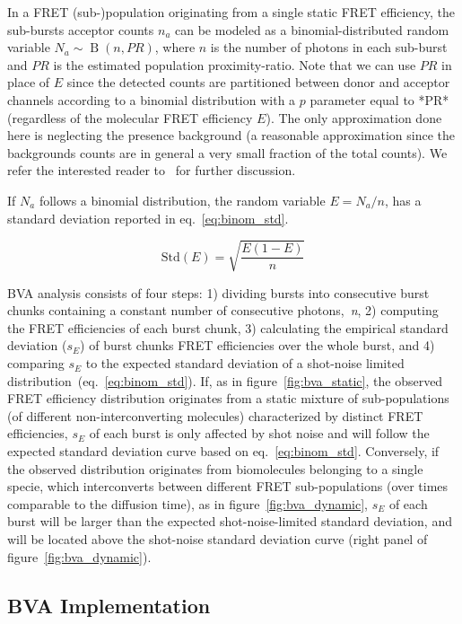 In a FRET (sub-)population originating from a single static FRET efficiency,
the sub-bursts acceptor counts $n_a$ can be modeled as a binomial-distributed random variable 
$N_a \sim \operatorname{B}(n, PR)$, where $n$ is the number of photons in each sub-burst and 
$PR$ is the estimated population proximity-ratio. 
Note that we can use $PR$ in place of $E$ since the detected counts are partitioned 
between donor and acceptor channels according to a binomial distribution with 
a $p$ parameter equal to *PR* (regardless of the molecular FRET efficiency $E$).
The only approximation done here is neglecting the presence background
(a reasonable approximation since the backgrounds counts are in general a 
very small fraction of the total counts). 
We refer the interested reader to~\cite{Torella_2011} for further discussion.

If $N_a$ follows a binomial distribution, the random variable $E = N_a/n$,
has a standard deviation reported in eq.~\ref{eq:binom_std}. 

\begin{equation}
\label{eq:binom_std}
\operatorname{Std(\textit{E})} = {\sqrt{\frac{E(1 - E)}{n}}}
\end{equation}

BVA analysis consists of four steps: 1) dividing bursts into consecutive burst chunks containing a constant number of consecutive photons,~\textit{n}, 2) computing the FRET efficiencies of each burst chunk, 3) calculating the empirical standard deviation ($s_E$) of burst chunks FRET efficiencies over the whole burst, and 4) comparing $s_E$ to the expected standard deviation of a shot-noise limited distribution~(eq.~\ref{eq:binom_std}).
If, as in figure~\ref{fig:bva_static}, the observed FRET efficiency distribution 
originates from a static mixture of sub-populations (of different 
non-interconverting molecules) characterized by distinct FRET efficiencies, 
$s_E$ of each burst is only affected by shot noise and will follow the expected standard deviation curve based on eq.~\ref{eq:binom_std}. 
Conversely, if the observed distribution originates from biomolecules belonging to a single specie, which 
interconverts between different FRET sub-populations (over times comparable to the diffusion 
time), as in figure~\ref{fig:bva_dynamic}, $s_E$ of each burst will be larger than the expected 
shot-noise-limited standard deviation, and will be located above the shot-noise standard 
deviation curve (right panel of figure~\ref{fig:bva_dynamic}).

\subsection{BVA Implementation}

